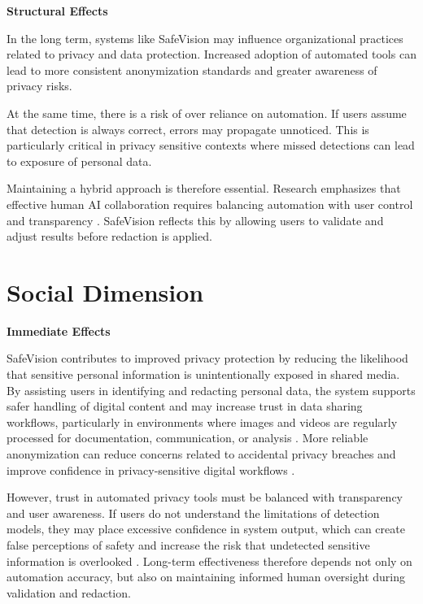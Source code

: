 \noindent\textbf{Structural Effects}

In the long term, systems like SafeVision may influence organizational practices related to privacy and data protection. Increased adoption of automated tools can lead to more consistent anonymization standards and greater awareness of privacy risks.

At the same time, there is a risk of over reliance on automation. If users assume that detection is always correct, errors may propagate unnoticed. This is particularly critical in privacy sensitive contexts where missed detections can lead to exposure of personal data.

Maintaining a hybrid approach is therefore essential. Research emphasizes that effective human AI collaboration requires balancing automation with user control and transparency \cite{amershi2019guidelines}. SafeVision reflects this by allowing users to validate and adjust results before redaction is applied.


\section{Social Dimension}

\noindent\textbf{Immediate Effects}

SafeVision contributes to improved privacy protection by reducing the likelihood that sensitive personal information is unintentionally exposed in shared media. By assisting users in identifying and redacting personal data, the system supports safer handling of digital content and may increase trust in data sharing workflows, particularly in environments where images and videos are regularly processed for documentation, communication, or analysis \cite{li2024image,zhao2023visual}. More reliable anonymization can reduce concerns related to accidental privacy breaches and improve confidence in privacy-sensitive digital workflows \cite{gdpr2016}.

However, trust in automated privacy tools must be balanced with transparency and user awareness. If users do not understand the limitations of detection models, they may place excessive confidence in system output, which can create false perceptions of safety and increase the risk that undetected sensitive information is overlooked \cite{parasuraman1997humans,amershi2019guidelines}. Long-term effectiveness therefore depends not only on automation accuracy, but also on maintaining informed human oversight during validation and redaction.

